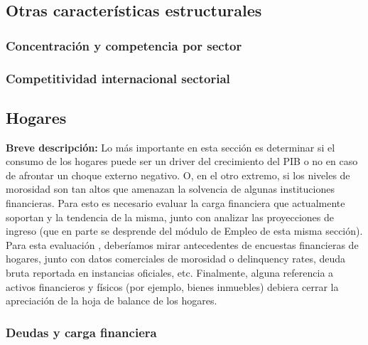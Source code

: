 \documentclass[12pt,a4paper]{article}
\begin{document}
\subsection{Otras características estructurales}

\subsubsection{Concentración y competencia por sector}

\subsubsection{Competitividad internacional sectorial}



\vspace{0.5cm}
\subsection{Hogares}

\textbf{Breve descripción:} \newline
Lo más importante en esta sección es determinar si el consumo de los hogares puede ser un driver del crecimiento del PIB o no en caso de afrontar un choque externo negativo. O, en el otro extremo, si los niveles de morosidad son tan altos que amenazan la solvencia de algunas instituciones financieras. Para esto es necesario evaluar la carga financiera que actualmente soportan y la tendencia de la misma, junto con analizar las proyecciones de ingreso (que en parte se desprende del módulo de Empleo de esta misma sección). Para esta evaluación , deberíamos mirar antecedentes de encuestas financieras de hogares, junto con datos comerciales de morosidad o delinquency rates, deuda bruta reportada en instancias oficiales, etc. Finalmente, alguna referencia a activos financieros y físicos (por ejemplo, bienes inmuebles) debiera cerrar la apreciación de la hoja de balance de los hogares.


\subsubsection{Deudas y carga financiera}
\end{document}
